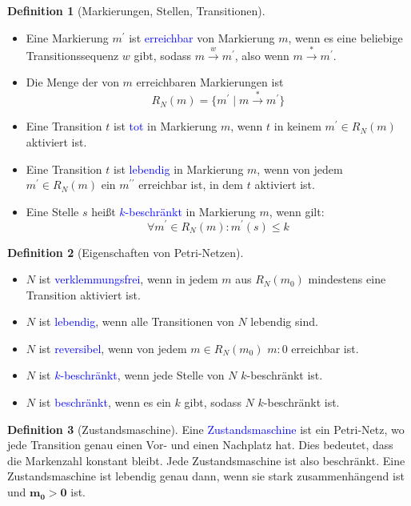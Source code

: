 \documentclass{scrreprt}
\theoremstyle{definition}
\newtheorem{Definition}{Definition}[section]
\theoremstyle{example}
\theoremstyle{algorithm}
\begin{document}
\begin{Definition}[Markierungen, Stellen, Transitionen]
\noindent
\begin{itemize}
\item
Eine Markierung $m^\prime$ ist \textcolor{blue}{erreichbar} von Markierung $m$, wenn es eine beliebige Transitionssequenz $w$ gibt, sodass $m\overset{w}{\longrightarrow}m^\prime$, also wenn $m\overset{*}{\longrightarrow}m^\prime$.
\item
Die Menge der von $m$ erreichbaren Markierungen ist
\begin{equation*}
R_N(m) = \{m^\prime \mid m\overset{*}{\longrightarrow}m^\prime\}
\end{equation*}
\item
Eine Transition $t$ ist \textcolor{blue}{tot} in Markierung $m$, wenn $t$ in keinem $m^\prime \in R_N(m)$ aktiviert ist.
\item
Eine Transition $t$ ist \textcolor{blue}{lebendig} in Markierung $m$, wenn von jedem $m^\prime \in R_N(m)$ ein $m^{\prime\prime}$ erreichbar ist, in dem $t$ aktiviert ist.
\item
Eine Stelle $s$ heißt \textcolor{blue}{$k$-beschränkt} in Markierung $m$, wenn gilt:
\begin{equation*}
\forall m^\prime \in R_N(m): m^\prime(s)\leq k
\end{equation*}
\end{itemize}
\end{Definition}

\begin{Definition}[Eigenschaften von Petri-Netzen]
\noindent
\begin{itemize}
\item
$N$ ist \textcolor{blue}{verklemmungsfrei}, wenn in jedem $m$ aus $R_N(m_0)$ mindestens eine Transition aktiviert ist.
\item
$N$ ist \textcolor{blue}{lebendig}, wenn alle Transitionen von $N$ lebendig sind.
\item
$N$ ist \textcolor{blue}{reversibel}, wenn von jedem $m \in R_N(m_0)$ $m:0$ erreichbar ist.
\item
$N$ ist \textcolor{blue}{$k$-beschränkt}, wenn jede Stelle von $N$ $k$-beschränkt ist.
\item
$N$ ist \textcolor{blue}{beschränkt}, wenn es ein $k$ gibt, sodass $N$ $k$-beschränkt ist.
\end{itemize}
\end{Definition}

\begin{Definition}[Zustandsmaschine]
Eine \textcolor{blue}{Zustandsmaschine} ist ein Petri-Netz, wo jede Transition genau einen Vor- und einen Nachplatz hat. Dies bedeutet, dass die Markenzahl konstant bleibt. Jede Zustandsmaschine ist also beschränkt. Eine Zustandsmaschine ist lebendig genau dann, wenn sie stark zusammenhängend ist und $\boldsymbol{m_0} > \boldsymbol{0}$ ist.
\end{Definition}
\end{document}
